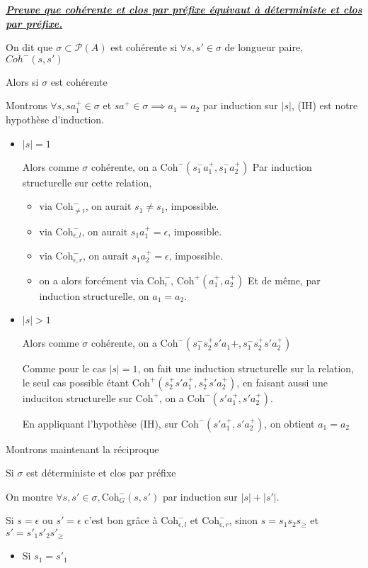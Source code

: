 \documentclass[a4paper,12ptCOUCOU
]{article}
\newlength{\mydepth}
\newlength{\myheight}
\newenvironment{answer}[1]
{\vspace{0.5cm}\begin{minipage}{\linewidth}\textbf{\textit{\underline{#1}}}\par\begin{lrbox}{\mybox}\quad\begin{minipage}{\linewidth}\color{black}\setlength{\parskip}{10pt}}
{\end{minipage}\end{lrbox}
\settodepth{\mydepth}{\usebox{\mybox}}
\settoheight{\myheight}{\usebox{\mybox}}
\addtolength{\myheight}{\mydepth}
\noindent\makebox[0pt]{
  \color{gray}\hspace{-0pt}\rule[-\mydepth]{1pt}{\myheight}}
\usebox{\mybox}
\end{minipage}
  }
\begin{document}
\begin{answer}{Preuve que cohérente et clos par préfixe équivaut à déterministe et clos par préfixe.}
On dit que $\sigma \subset \mathcal{P}(A)$ est cohérente si
$\forall s, s' \in \sigma$ de longueur paire, $ Coh^-(s,s')$

Alors si $\sigma$ est cohérente

Montrons $\forall s, sa_1^+ \in \sigma$ et $s a^+ \in \sigma \implies a_1 = a_2$
par induction sur $|s|$, (IH) est notre hypothèse d'induction.

\begin{itemize}
\item $|s| = 1$

Alors comme $\sigma$ cohérente, on a $\text{Coh}^-(s_1^-a_1^+,s_1^-a_2^+)$
Par induction structurelle sur cette relation,
\begin{itemize}
\item via $\text{Coh}^-_{\neq i}$, on aurait $s_1 \neq s_1$, impossible.
\item via $\text{Coh}^-_{\epsilon,l}$, on aurait $s_1a_1^+ = \epsilon$, impossible.
\item via $\text{Coh}^-_{\epsilon,r}$, on aurait $s_1a_2^+ = \epsilon$, impossible.
\item on a alors forcément via $\text{Coh}^-_i$, $\text{Coh}^+(a_1^+,a_2^+)$
Et de même, par induction structurelle, on $a_1 = a_2$.

\end{itemize}
\item $|s| > 1$

Alors comme $\sigma$ cohérente, on a $\text{Coh}^-(s_1^-s_2^+s'a_1+,s_1^-s_2^+s'a_2^+)$

Comme pour le cas $|s|=1$, on fait une induction structurelle sur la relation,
le seul cas possible étant $\text{Coh}^+(s_2^+s'a_1^+, s_2^+s'a_2^+)$,
en faisant aussi une induciton structurelle sur $\text{Coh}^+$,
on a $\text{Coh}^-(s'a_1^+, s'a_2^+)$.

En appliquant l'hypothèse (IH), sur $\text{Coh}^-(s'a_1^+,s'a_2^+)$, on
obtient $a_1 = a_2$

\end{itemize}

Montrons maintenant la réciproque

Si $\sigma$ est déterministe et clos par préfixe

On montre $\forall s, s' \in \sigma, \text{Coh}^-_G(s,s')$ par induction sur
$|s|+|s'|$.

Si $s=\epsilon$ ou $s'=\epsilon$ c'est bon grâce à
$\text{Coh}^-_{\epsilon, l}$ et $\text{Coh}^-_{\epsilon, r}$, sinon
$s = s_1 s_2 s_\geq$ et $s' = s'_1 s'_2 s'_\geq$
\begin{itemize}
\item Si $s_1 = s'_1$


\end{itemize}
\end{answer}
\end{document}
